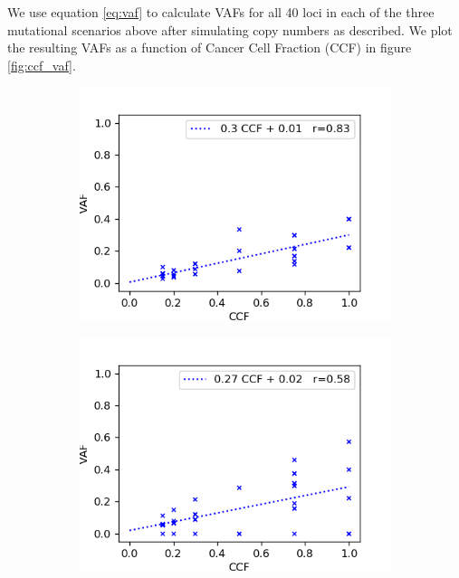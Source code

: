 \documentclass{article}
\begin{document}
We use equation \ref{eq:vaf} to calculate VAFs for all 40 loci in each of the three mutational scenarios above after simulating copy numbers as described. We plot the resulting VAFs as a function of Cancer Cell Fraction (CCF) in figure \ref{fig:ccf_vaf}.

\begin{figure}[h]
	\centering
	\begin{subfigure}[t]{0.30\linewidth}
		\centering
		\includegraphics[width = 1.0\linewidth, trim={0 0 20 20}, clip=true]{after_ccf_vaf.png}
	\end{subfigure}%
	\hspace{0.02 \linewidth}
	\begin{subfigure}[t]{0.30\linewidth}
		\centering
		\includegraphics[width = 1.0\linewidth, trim={0 0 20 20}, clip=true]{minor_ccf_vaf.png}

\end{subfigure}
\end{figure}
\end{document}
